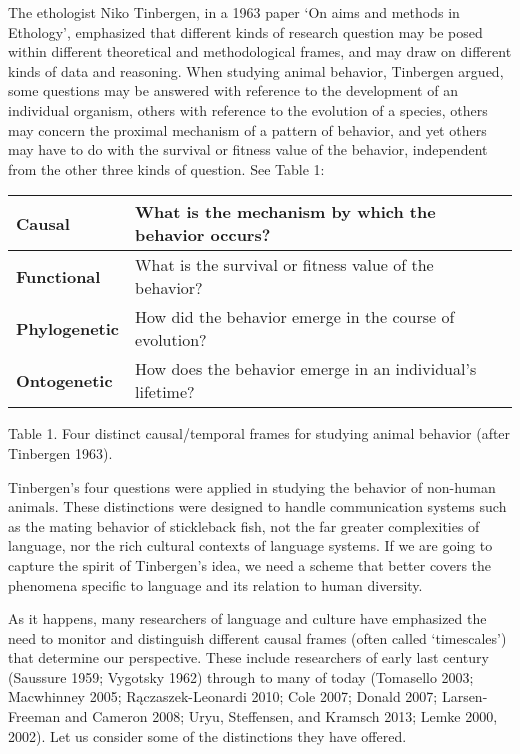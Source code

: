The ethologist Niko Tinbergen, in a 1963 paper \textquoteleft On aims and methods in 
Ethology', emphasized that different kinds of research question may be 
posed within different theoretical and methodological frames, and may 
draw on different kinds of data and reasoning. When studying animal 
behavior, Tinbergen argued, some questions may be answered with 
reference to the development of an individual organism, others with 
reference to the evolution of a species, others may concern the proximal 
mechanism of a pattern of behavior, and yet others may have to do with 
the survival or fitness value of the behavior, independent from the 
other three kinds of question. See Table 1:



\begin{table}[h]
\centering
\begin{tabular}{|l|l|}
\hline
\textbf{Causal} & What is the mechanism by which the behavior occurs?
\\
\hline
\textbf{Functional} & What is the survival or fitness value of the 
behavior? \\
\hline
\textbf{Phylogenetic} & How did the behavior emerge in the course of 
evolution? \\
\hline
\textbf{Ontogenetic} & How does the behavior emerge in an individual's 
lifetime? \\
\hline
\end{tabular}
\end{table}


Table 1. Four distinct causal/temporal frames for studying animal 
behavior (after Tinbergen 1963).



Tinbergen's four questions were applied in studying the behavior of 
non-human animals. These distinctions were designed to handle 
communication systems such as the mating behavior of stickleback fish, 
not the far greater complexities of language, nor the rich cultural 
contexts of language systems. If we are going to capture the spirit of 
Tinbergen's idea, we need a scheme that better covers the phenomena 
specific to language and its relation to human diversity. 



As it happens, many researchers of language and culture have emphasized 
the need to monitor and distinguish different causal frames (often 
called \textquoteleft timescales') that determine our perspective. These include 
researchers of early last century (Saussure 1959; Vygotsky 1962) through 
to many of today (Tomasello 2003; Macwhinney 2005; R\k{a}czaszek-Leonardi 
2010; Cole 2007; Donald 2007; Larsen-Freeman and Cameron 2008; Uryu, 
Steffensen, and Kramsch 2013; Lemke 2000, 2002). Let us consider some of 
the distinctions they have offered.



